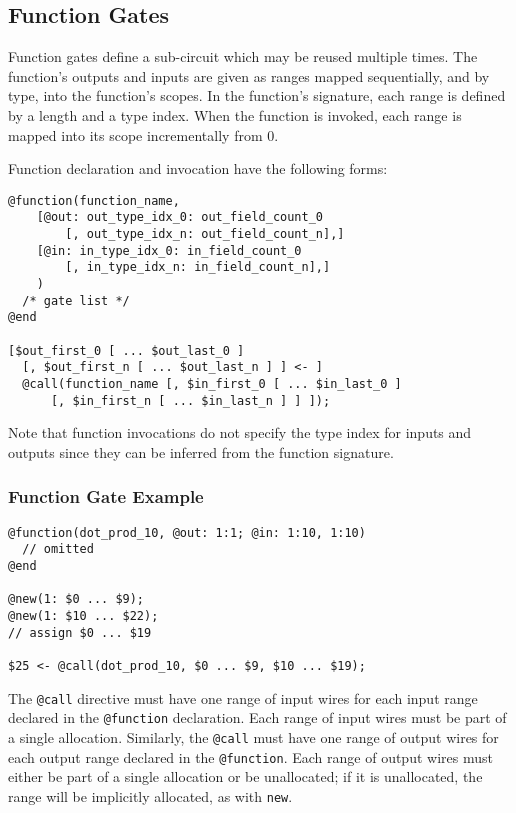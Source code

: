 \subsection{Function Gates}

Function gates define a sub-circuit which may be reused multiple times.
The function's outputs and inputs are given as ranges mapped sequentially, and by type, into the function's scopes.
In the function's signature, each range is defined by a length and a type index.
When the function is invoked, each range is mapped into its scope incrementally from 0.

Function declaration and invocation have the following forms:
%
\begin{lstlisting}[language=ir]
@function(function_name,
    [@out: out_type_idx_0: out_field_count_0
	    [, out_type_idx_n: out_field_count_n],]
    [@in: in_type_idx_0: in_field_count_0
	    [, in_type_idx_n: in_field_count_n],]
    )
  /* gate list */
@end

[$out_first_0 [ ... $out_last_0 ]
  [, $out_first_n [ ... $out_last_n ] ] <- ]
  @call(function_name [, $in_first_0 [ ... $in_last_0 ]
      [, $in_first_n [ ... $in_last_n ] ] ]);
\end{lstlisting}
Note that function invocations do not specify the type index for inputs and outputs since they can be inferred from the function signature.

\subsubsection{Function Gate Example}
\begin{lstlisting}[language=ir]
@function(dot_prod_10, @out: 1:1; @in: 1:10, 1:10)
  // omitted
@end

@new(1: $0 ... $9);
@new(1: $10 ... $22);
// assign $0 ... $19

$25 <- @call(dot_prod_10, $0 ... $9, $10 ... $19);
\end{lstlisting}

The \texttt{@call} directive must have one range of input wires for each input
range declared in the \texttt{@function} declaration.
Each range of input wires must be part of a single allocation.
Similarly, the \texttt{@call} must have one range of output wires for each
output range declared in the \texttt{@function}.
Each range of output wires must either be part of a single allocation or be
unallocated; if it is unallocated, the range will be implicitly allocated, as
with \texttt{new}.


